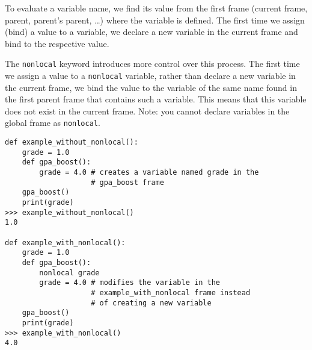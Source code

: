 To evaluate a variable name, we find its value from the first frame (current frame, parent, parent’s parent, …) where the variable is defined. The first time we assign (bind) a value to a variable, we declare a new variable in the current frame and bind to the respective value.

The \lstinline{nonlocal} keyword introduces more control over this process. The first time we assign a value to a \lstinline{nonlocal} variable, rather than declare a new variable in the current frame, we bind the value to the variable of the same name found in the first parent frame that contains such a variable. This means that this variable does not exist in the current frame. Note: you cannot declare variables in the global frame as \lstinline{nonlocal}.
\newline
\begin{lstlisting}
def example_without_nonlocal():
    grade = 1.0
    def gpa_boost():
        grade = 4.0 # creates a variable named grade in the 
                    # gpa_boost frame
    gpa_boost()
    print(grade)
>>> example_without_nonlocal()
1.0

def example_with_nonlocal():
    grade = 1.0
    def gpa_boost():
        nonlocal grade
        grade = 4.0 # modifies the variable in the
                    # example_with_nonlocal frame instead
                    # of creating a new variable
    gpa_boost()
    print(grade)
>>> example_with_nonlocal()
4.0
\end{lstlisting}